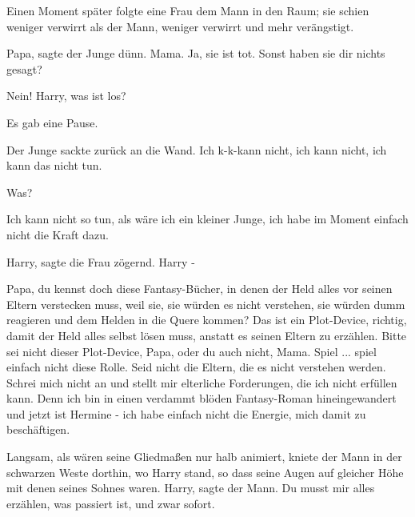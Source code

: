 Einen Moment später folgte eine Frau dem Mann in den Raum; sie schien weniger
verwirrt als der Mann, weniger verwirrt und mehr verängstigt.

\glqq{}Papa\grqq{}, sagte der Junge dünn. \glqq{}Mama. Ja, sie ist tot. Sonst haben
sie dir nichts gesagt?\grqq{}

\glqq{}Nein! Harry, was ist los?\grqq{}

Es gab eine Pause.

Der Junge sackte zurück an die Wand. \glqq{}Ich k-k-kann nicht, ich kann nicht,
ich kann das nicht tun.\grqq{}

\glqq{}Was?\grqq{}

\glqq{}Ich kann nicht so tun, als wäre ich ein kleiner Junge, ich habe im Moment
einfach nicht die Kraft dazu.\grqq{}

\glqq{}Harry\grqq{}, sagte die Frau zögernd. \glqq{}Harry -\grqq{}

\glqq{}Papa, du kennst doch diese Fantasy-Bücher, in denen der Held alles vor
seinen Eltern verstecken muss, weil sie, sie würden es nicht verstehen, sie
würden dumm reagieren und dem Helden in die Quere kommen? Das ist ein
Plot-Device, richtig, damit der Held alles selbst lösen muss, anstatt es seinen
Eltern zu erzählen. Bitte sei nicht dieser Plot-Device, Papa, oder du auch nicht,
Mama. Spiel ... spiel einfach nicht diese Rolle. Seid nicht die Eltern, die es
nicht verstehen werden. Schrei mich nicht an und stellt mir elterliche
Forderungen, die ich nicht erfüllen kann. Denn ich bin in einen verdammt blöden
Fantasy-Roman hineingewandert und jetzt ist Hermine - ich habe einfach nicht die
Energie, mich damit zu beschäftigen.\grqq{}

Langsam, als wären seine Gliedmaßen nur halb animiert, kniete der Mann in der
schwarzen Weste dorthin, wo Harry stand, so dass seine Augen auf gleicher Höhe
mit denen seines Sohnes waren. \glqq{}Harry\grqq{}, sagte der Mann. \glqq{}Du
musst mir alles erzählen, was passiert ist, und zwar sofort.\grqq{}

